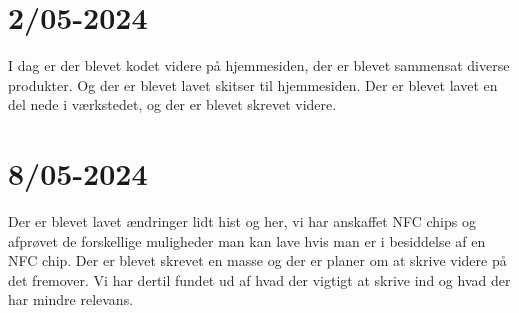 \documentclass[12pt, a4paper]{article}
\begin{document}
    \section{2/05-2024}
    I dag er der blevet kodet videre på hjemmesiden, der er blevet sammensat diverse produkter. Og der er
    blevet lavet skitser til hjemmesiden. Der er blevet lavet en del nede i værkstedet, og der er blevet
    skrevet videre. 
    \section{8/05-2024}
    Der er blevet lavet ændringer lidt hist og her, vi har anskaffet NFC chips og afprøvet de forskellige
    muligheder man kan lave hvis man er i besiddelse af en NFC chip. Der er blevet skrevet en masse og
    der er planer om at skrive videre på det fremover. Vi har dertil fundet ud af hvad der vigtigt at skrive ind
    og hvad der har mindre relevans.
\end{document}
